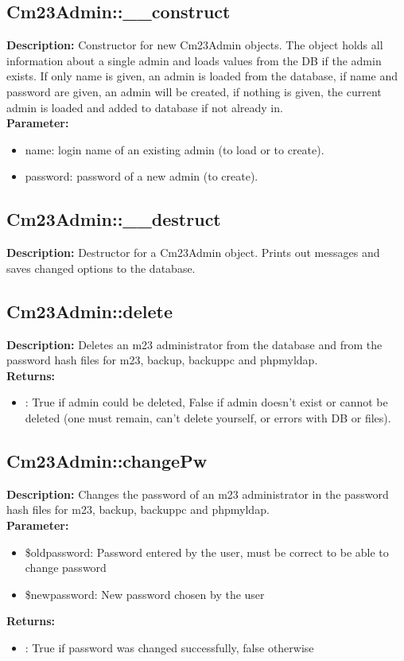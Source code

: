 \subsection{Cm23Admin::\_\_construct}
\textbf{Description:} Constructor for new Cm23Admin objects. The object holds all information about a single admin and loads values from the DB if the admin exists. If only name is given, an admin is loaded from the database, if name and password are given, an admin will be created, if nothing is given, the current admin is loaded and added to database if not already in.\\
\textbf{Parameter:}
\begin{itemize}
\item name: login name of an existing admin (to load or to create).
\item password: password of a new admin (to create).
\end{itemize}

\subsection{Cm23Admin::\_\_destruct}
\textbf{Description:} Destructor for a Cm23Admin object. Prints out messages and saves changed options to the database.\\

\subsection{Cm23Admin::delete}
\textbf{Description:} Deletes an m23 administrator from the database and from the password hash files for m23, backup, backuppc and phpmyldap.\\
\textbf{Returns:}
\begin{itemize}
\item : True if admin could be deleted, False if admin doesn't exist or cannot be deleted (one must remain, can't delete yourself, or errors with DB or files).
\end{itemize}

\subsection{Cm23Admin::changePw}
\textbf{Description:} Changes the password of an m23 administrator in the password hash files for m23, backup, backuppc and phpmyldap.\\
\textbf{Parameter:}
\begin{itemize}
\item \$oldpassword: Password entered by the user, must be correct to be able to change password
\item \$newpassword: New password chosen by the user
\end{itemize}
\textbf{Returns:}
\begin{itemize}
\item : True if password was changed successfully, false otherwise
\end{itemize}

